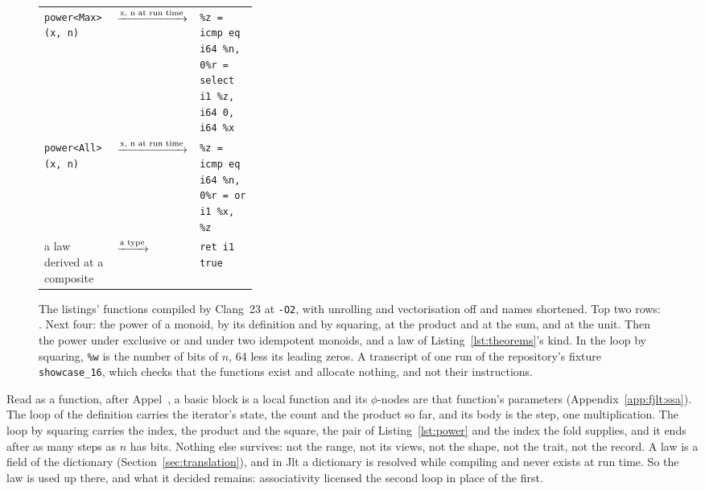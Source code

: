 \begin{figure}[htbp]
\begin{tabularx}{\linewidth}{@{}>{\raggedright\arraybackslash}p{0.34\linewidth}l>{\raggedright\arraybackslash}X@{}}
\texttt{power<Max>(x, n)} & $\xrightarrow{\text{\scriptsize x, n at run time}}$ & \texttt{\%z = icmp eq i64 \%n, 0}\newline \texttt{\%r = select i1 \%z, i64 0, i64 \%x} \\[3pt]
\texttt{power<All>(x, n)} & $\xrightarrow{\text{\scriptsize x, n at run time}}$ & \texttt{\%z = icmp eq i64 \%n, 0}\newline \texttt{\%r = or i1 \%x, \%z} \\[3pt]
a law derived at a composite & $\xrightarrow{\text{\scriptsize a type}}$ & \texttt{ret i1 true} \\
\bottomrule
\end{tabularx}
\caption{The listings' functions compiled by Clang~23 at \texttt{-O2}, with unrolling and vectorisation off and names shortened.
Top two rows: .
Next four: the power of a monoid, by its definition and by squaring, at the product and at the sum, and at the unit.
Then the power under exclusive or and under two idempotent monoids, and a law of Listing~\ref{lst:theorems}'s kind.
In the loop by squaring, \texttt{\%w} is the number of bits of $n$, 64 less its leading zeros.
A transcript of one run of the repository's fixture \texttt{showcase\_16}, which checks that the functions exist and allocate nothing, and not their instructions.}
\label{fig:sketch-ir}
\end{figure}

Read as a function, after Appel~\cite{appel1998ssa}, a basic block is a local function and its $\phi$-nodes are that function's parameters (Appendix~\ref{app:fjlt:ssa}).
The loop of the definition carries the iterator's state, the count and the product so far, and its body is the step, one multiplication.
The loop by squaring carries the index, the product and the square, the pair of Listing~\ref{lst:power} and the index the fold supplies, and it ends after as many steps as $n$ has bits.
Nothing else survives: not the range, not its views, not the shape, not the trait, not the record.
A law is a field of the dictionary (Section~\ref{sec:translation}), and in Jlt a dictionary is resolved while compiling and never exists at run time.
So the law is used up there, and what it decided remains: associativity licensed the second loop in place of the first.

